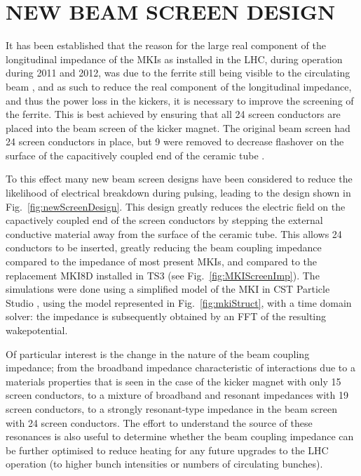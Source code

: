 \documentclass{JAC2003}
\begin{document}
\section{NEW BEAM SCREEN DESIGN}

It has been established that the reason for the large real component of the longitudinal impedance of the MKIs as installed in the LHC, during operation during 2011 and 2012, was due to the ferrite still being visible to the circulating beam \cite{kicker_meas}, and as such to reduce the real component of the longitudinal impedance, and thus the power loss in the kickers, it is necessary to improve the screening of the ferrite. This is best achieved by ensuring that all 24 screen conductors are placed into the beam screen of the kicker magnet. The original beam screen had 24 screen conductors in place, but 9 were removed to decrease flashover on the surface of the capacitively coupled end of the ceramic tube \cite{mki-ElecBreakdown}. 

To this effect many new beam screen designs have been considered to reduce the likelihood of electrical breakdown during pulsing, leading to the design shown in Fig.~\ref{fig:newScreenDesign}. This design greatly reduces the electric field on the capactively coupled end of the screen conductors by stepping the external conductive material away from the surface of the ceramic tube. This allows 24 conductors to be inserted, greatly reducing the beam coupling impedance compared to the impedance of most present MKIs, and compared to the replacement MKI8D installed in TS3 (see Fig.~\ref{fig:MKIScreenImp}). The simulations were done using a simplified model of the MKI in CST Particle Studio \cite{cst-cite}, using the model represented in Fig.~\ref{fig:mkiStruct}, with a time domain solver: the impedance is subsequently obtained by an FFT of the resulting wakepotential. 

Of particular interest is the change in the nature of the beam coupling impedance; from the broadband impedance characteristic of interactions due to a materials properties that is seen in the case of the kicker magnet with only 15 screen conductors, to a mixture of broadband and resonant impedances with 19 screen conductors, to a strongly resonant-type impedance in the beam screen with 24 screen conductors. The effort to understand the source of these resonances is also useful to determine whether the beam coupling impedance can be further optimised to reduce heating for any future upgrades to the LHC operation (to higher bunch intensities or numbers of circulating bunches).
\end{document}
